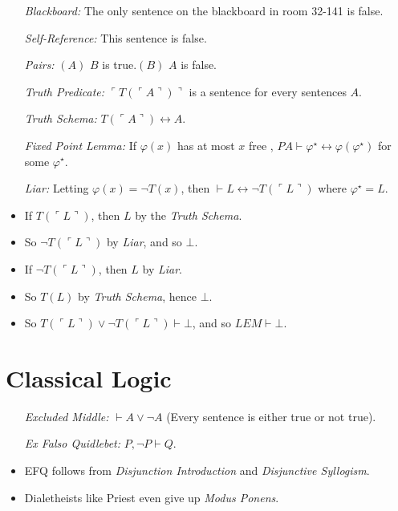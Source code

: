 \documentclass[a4paper, 11pt]{article} %
\newcommand{\corner}[1]{\ulcorner#1\urcorner} %
\begin{document}
\begin{itemize}
  \item[\it Blackboard:] The only sentence on the blackboard in room 32-141 is false.
  \item[\it Self-Reference:] This sentence is false. 
  \item[\it Pairs:] $(A)$ $B$ is true.\quad\quad $(B)$ $A$ is false. 
  \item[\it Truth Predicate:] $\corner{T(\corner{A})}$ is a sentence for every sentences $A$. 
  \item[\it Truth Schema:] $T(\corner{A}) \leftrightarrow A$. 
  \item[\it Fixed Point Lemma:] If $\varphi(x)$ has at most $x$ free , $PA \vdash  \varphi^\star \leftrightarrow \varphi(\varphi^\star)$ for some $\varphi^\star$.
  \item[\it Liar:] Letting $\varphi(x) = \neg T(x)$, then $\vdash L \leftrightarrow \neg T(\corner{L})$ where $\varphi^\star = L$.
    \item If $T(\corner{L})$, then $L$ by the \textit{Truth Schema}.
    \item So $\neg T(\corner{L})$ by \textit{Liar}, and so $\bot$.
    \item If $\neg T(\corner{L})$, then $L$ by \textit{Liar}.
    \item So $T(L)$ by \textit{Truth Schema}, hence $\bot$. 
    \item So $T(\corner{L}) \vee \neg T(\corner{L}) \vdash \bot$, and so $LEM \vdash \bot$.
\end{itemize}





\section*{Classical Logic}

\begin{itemize}
  \item[\it Excluded Middle:] $\vdash A \vee \neg A$ (Every sentence is either true or not true).
  \item[\it Ex Falso Quidlebet:] $P, \neg P \vdash Q$. 
    \item EFQ follows from \textit{Disjunction Introduction} and \textit{Disjunctive Syllogism}.
    \item Dialetheists like Priest even give up \textit{Modus Ponens}.
\end{itemize}
\end{document}
